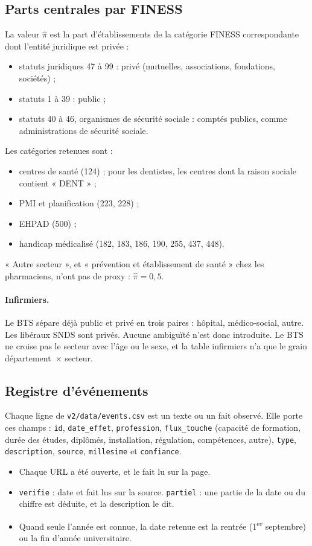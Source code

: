 \subsection{Parts centrales par FINESS}
La valeur $\hat\pi$ est la part d'établissements de la catégorie FINESS correspondante dont l'entité juridique est
privée :
\begin{itemize}
  \item statuts juridiques 47 à 99 : privé (mutuelles, associations, fondations, sociétés) ;
  \item statuts 1 à 39 : public ;
  \item statuts 40 à 46, organismes de sécurité sociale : comptés publics, comme administrations de sécurité
  sociale.
\end{itemize}
Les catégories retenues sont :
\begin{itemize}
  \item centres de santé (124) ; pour les dentistes, les centres dont la raison sociale contient « DENT » ;
  \item PMI et planification (223, 228) ;
  \item EHPAD (500) ;
  \item handicap médicalisé (182, 183, 186, 190, 255, 437, 448).
\end{itemize}
« Autre secteur », et « prévention et établissement de santé » chez les pharmaciens, n'ont pas de proxy :
$\hat\pi = 0{,}5$\suppose{}.

\paragraph{Infirmiers.} Le BTS sépare déjà public et privé en trois paires : hôpital, médico-social, autre. Les
libéraux SNDS sont privés. Aucune ambiguïté n'est donc introduite. Le BTS ne croise pas le secteur avec l'âge ou
le sexe, et la table infirmiers n'a que le grain département~$\times$ secteur.

\subsection{Registre d'événements}
Chaque ligne de \texttt{v2/data/events.csv} est un texte ou un fait observé. Elle porte ces champs :
\texttt{id}, \texttt{date\_effet}, \texttt{profession}, \texttt{flux\_touche} (capacité de formation, durée des
études, diplômés, installation, régulation, compétences, autre), \texttt{type}, \texttt{description},
\texttt{source}, \texttt{millesime} et \texttt{confiance}.
\begin{itemize}
  \item Chaque URL a été ouverte, et le fait lu sur la page.
  \item \texttt{verifie} : date et fait lus sur la source. \texttt{partiel} : une partie de la date ou du chiffre
  est déduite, et la description le dit.
  \item Quand seule l'année est connue, la date retenue est la rentrée (1\textsuperscript{er} septembre) ou la fin
  d'année universitaire.
\end{itemize}

